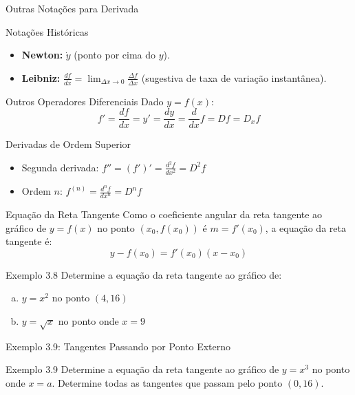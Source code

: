 \documentclass[10pt, aspectratio=169]{beamer}
\begin{document}
\begin{frame}{Outras Notações para Derivada}
  \begin{block}{Notações Históricas}
    \begin{itemize}
      \item \textbf{Newton:} $\dot{y}$ (ponto por cima do $y$).
      \item \textbf{Leibniz:} $\frac{df}{dx} = \lim_{\Delta x \to 0} \frac{\Delta f}{\Delta x}$ (sugestiva de taxa de variação instantânea).
    \end{itemize}
  \end{block}

  \begin{block}{Outros Operadores Diferenciais}
    Dado $y = f(x)$:
    \[ f' = \frac{df}{dx} = y' = \frac{dy}{dx} = \frac{d}{dx}f = Df = D_x f \]
  \end{block}

  \begin{block}{Derivadas de Ordem Superior}
    \begin{itemize}
      \item Segunda derivada: $f'' = (f')' = \frac{d^2 f}{dx^2} = D^2 f$
      \item Ordem $n$: $f^{(n)} = \frac{d^n f}{dx^n} = D^n f$
    \end{itemize}
  \end{block}
\end{frame}

\begin{frame}{Equação da Reta Tangente}
  Como o coeficiente angular da reta tangente ao gráfico de $y = f(x)$ no ponto $(x_0, f(x_0))$ é $m = f'(x_0)$, a equação da reta tangente é:
  \[ y - f(x_0) = f'(x_0)(x - x_0) \]

  \begin{exampleblock}{Exemplo 3.8}
    Determine a equação da reta tangente ao gráfico de:
    \begin{enumerate}[(a)]
      \item $y = x^2$ no ponto $(4, 16)$
      \vspace{0.8cm}
      \item $y = \sqrt{x}$ no ponto onde $x = 9$
    \end{enumerate}
  \end{exampleblock}
\end{frame}

\begin{frame}{Exemplo 3.9: Tangentes Passando por Ponto Externo}
  \begin{exampleblock}{Exemplo 3.9}
    Determine a equação da reta tangente ao gráfico de $y = x^3$ no ponto onde $x = a$. Determine todas as tangentes que passam pelo ponto $(0, 16)$.
  \end{exampleblock}
\end{frame}
\end{document}
